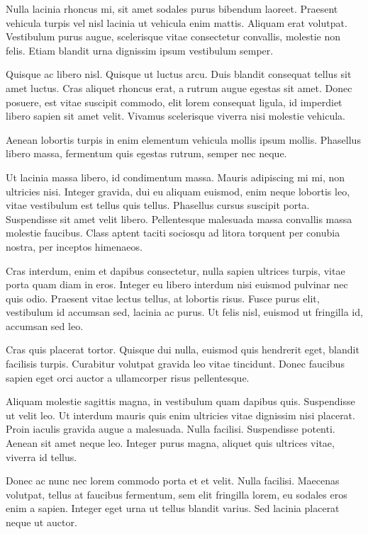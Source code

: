 \documentclass[12pt,a4paper]{report}
\begin{document}
Nulla lacinia rhoncus mi, sit amet sodales purus bibendum laoreet. Praesent vehicula turpis vel nisl lacinia ut vehicula enim mattis. Aliquam erat volutpat. Vestibulum purus augue, scelerisque vitae consectetur convallis, molestie non felis. Etiam blandit urna dignissim ipsum vestibulum semper.

Quisque ac libero nisl. Quisque ut luctus arcu. Duis blandit consequat tellus sit amet luctus. Cras aliquet rhoncus erat, a rutrum augue egestas sit amet. Donec posuere, est vitae suscipit commodo, elit lorem consequat ligula, id imperdiet libero sapien sit amet velit. Vivamus scelerisque viverra nisi molestie vehicula. 

Aenean lobortis turpis in enim elementum vehicula mollis ipsum mollis. Phasellus libero massa, fermentum quis egestas rutrum, semper nec neque.

Ut lacinia massa libero, id condimentum massa. Mauris adipiscing mi mi, non ultricies nisi. Integer gravida, dui eu aliquam euismod, enim neque lobortis leo, vitae vestibulum est tellus quis tellus. Phasellus cursus suscipit porta. Suspendisse sit amet velit libero. Pellentesque malesuada massa convallis massa molestie faucibus. Class aptent taciti sociosqu ad litora torquent per conubia nostra, per inceptos himenaeos. 

Cras interdum, enim et dapibus consectetur, nulla sapien ultrices turpis, vitae porta quam diam in eros. Integer eu libero interdum nisi euismod pulvinar nec quis odio. Praesent vitae lectus tellus, at lobortis risus. Fusce purus elit, vestibulum id accumsan sed, lacinia ac purus. Ut felis nisl, euismod ut fringilla id, accumsan sed leo. 

Cras quis placerat tortor. Quisque dui nulla, euismod quis hendrerit eget, blandit facilisis turpis. Curabitur volutpat gravida leo vitae tincidunt. Donec faucibus sapien eget orci auctor a ullamcorper risus pellentesque.



Aliquam molestie sagittis magna, in vestibulum quam dapibus quis. Suspendisse ut velit leo. Ut interdum mauris quis enim ultricies vitae dignissim nisi placerat. Proin iaculis gravida augue a malesuada. Nulla facilisi. Suspendisse potenti. Aenean sit amet neque leo. Integer purus magna, aliquet quis ultrices vitae, viverra id tellus. 

Donec ac nunc nec lorem commodo porta et et velit. Nulla facilisi. Maecenas volutpat, tellus at faucibus fermentum, sem elit fringilla lorem, eu sodales eros enim a sapien. Integer eget urna ut tellus blandit varius. Sed lacinia placerat neque ut auctor.
\end{document}
